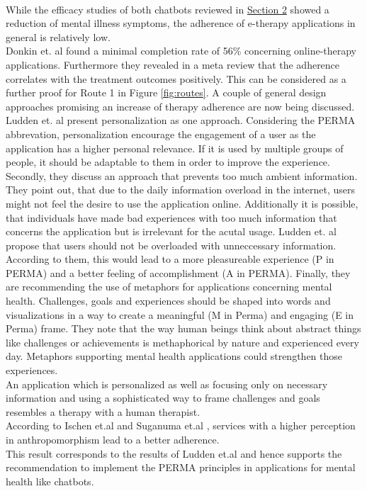\documentclass[sigconf, nonacm]{acmart}
\begin{document}
\\
While the efficacy studies of both chatbots reviewed in \hyperref[sec:two]{Section 2} showed a reduction of mental illness symptoms, the adherence of e-therapy applications in general is relatively low.\cite{Fitzpatrick2017, Ischen}
\\
Donkin et. al \cite{Donkin} found a minimal completion rate of 56\% concerning online-therapy applications. Furthermore they revealed in a meta review that the adherence correlates with the treatment outcomes positively\cite{Donkin2011}.
This can be considered as a further proof for Route 1 in Figure \ref{fig:routes}.  
A couple of general design approaches promising an increase of therapy adherence are now being discussed.
\\
Ludden et. al \cite{Ludden2015} present personalization as one approach. Considering the PERMA abbrevation, personalization encourage the engagement of a user as the application has a higher personal relevance. If it is used by multiple groups of people, it should be adaptable to them in order to improve the experience.
Secondly, they discuss an approach that prevents too much ambient information. They point out, that due to the daily information overload in the internet, users might not feel the desire to use the
application online. Additionally it is possible, that individuals have made bad experiences with too much information that concerns the application but is irrelevant for the acutal usage. 
Ludden et. al propose that users should not be overloaded with unneccessary information. According to them, this would lead to a more pleasureable experience (P in PERMA) and a better feeling of accomplishment (A in PERMA).
Finally, they are recommending the use of metaphors for applications concerning mental health. Challenges, goals and experiences should be shaped into words and visualizations in a way to create a meaningful (M in Perma) and engaging (E in Perma) frame.
They note that the way human beings think about abstract things like challenges or achievements is methaphorical by nature and experienced every day. Metaphors supporting mental health applications could strengthen those experiences.
\\
An application which is personalized as well as focusing only on necessary information and using a sophisticated way to frame challenges and goals resembles a therapy with a human therapist.
\\
According to Ischen et.al \cite{Ischen} and Suganuma et.al \cite{Suganuma2018}, services with a higher perception in anthropomorphism lead to a better adherence.
\\
This result corresponds to the results of Ludden et.al \cite{Ludden2015} and hence supports the recommendation to implement the PERMA principles in applications for mental health like chatbots. 
\\
\end{document}
